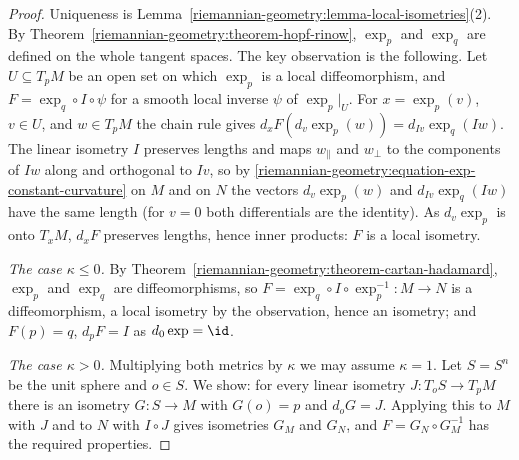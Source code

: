\begin{proof}
Uniqueness is Lemma~\ref{riemannian-geometry:lemma-local-isometries}(2). By Theorem~\ref{riemannian-geometry:theorem-hopf-rinow}, $\exp_p$ and $\exp_q$ are defined on
the whole tangent spaces. The key observation is the following. Let $U \subseteq T_pM$ be an open set on which $\exp_p$ is a local diffeomorphism, and
$F = \exp_q \circ I \circ \psi$ for a smooth local inverse $\psi$ of $\exp_p|_U$. For $x = \exp_p(v)$, $v \in U$, and $w \in T_pM$ the chain rule gives
$d_xF(d_v\exp_p(w)) = d_{Iv}\exp_q(Iw)$. The linear isometry $I$ preserves lengths and maps $w_\parallel$ and $w_\perp$ to the components of $Iw$ along and orthogonal to
$Iv$, so by \eqref{riemannian-geometry:equation-exp-constant-curvature} on $M$ and on $N$ the vectors $d_v\exp_p(w)$ and $d_{Iv}\exp_q(Iw)$ have the same length (for $v = 0$ both differentials are the identity). As
$d_v\exp_p$ is onto $T_xM$, $d_xF$ preserves lengths, hence inner products: $F$ is a local isometry.

\emph{The case $\kappa \leq 0$.} By Theorem~\ref{riemannian-geometry:theorem-cartan-hadamard}, $\exp_p$ and $\exp_q$ are diffeomorphisms, so
$F = \exp_q \circ I \circ \exp_p^{-1} \colon M \to N$ is a diffeomorphism, a local isometry by the observation, hence an isometry; and $F(p) = q$, $d_pF = I$ as
$d_0\exp = \id$.

\emph{The case $\kappa > 0$.} Multiplying both metrics by $\kappa$ we may assume $\kappa = 1$. Let $S = S^n$ be the unit sphere and $o \in S$. We show: for every linear
isometry $J \colon T_oS \to T_pM$ there is an isometry $G \colon S \to M$ with $G(o) = p$ and $d_oG = J$. Applying this to $M$ with $J$ and to $N$ with $I \circ J$ gives
isometries $G_M$ and $G_N$, and $F = G_N \circ G_M^{-1}$ has the required properties.


\end{proof}
